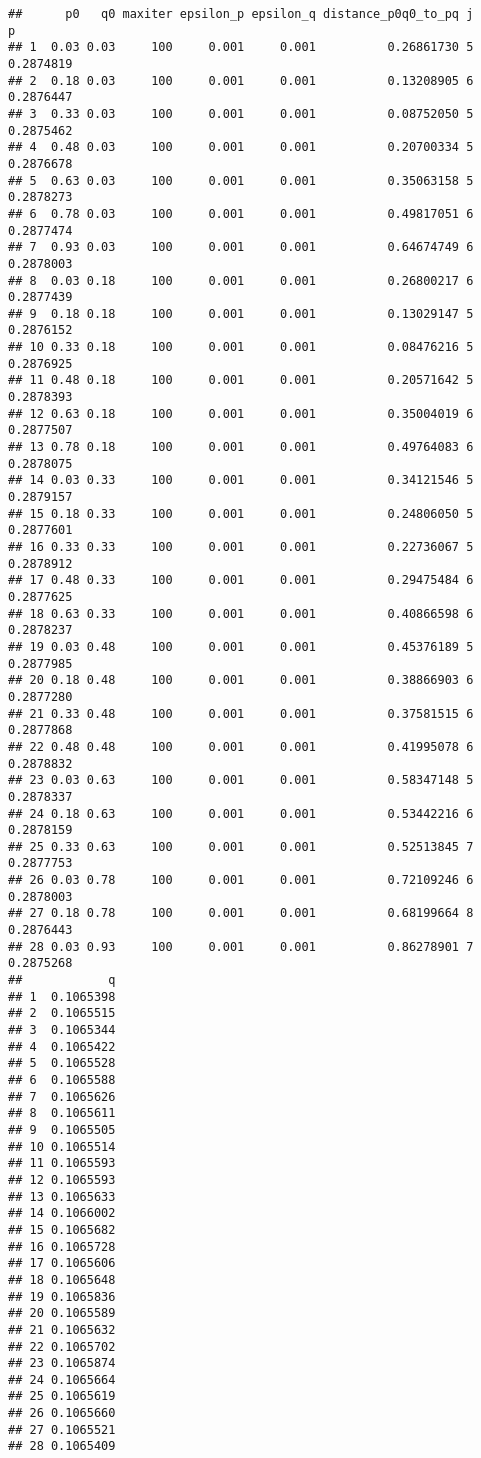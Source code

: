 \documentclass[]{article}
\begin{document}
\begin{verbatim}
##      p0   q0 maxiter epsilon_p epsilon_q distance_p0q0_to_pq j         p
## 1  0.03 0.03     100     0.001     0.001          0.26861730 5 0.2874819
## 2  0.18 0.03     100     0.001     0.001          0.13208905 6 0.2876447
## 3  0.33 0.03     100     0.001     0.001          0.08752050 5 0.2875462
## 4  0.48 0.03     100     0.001     0.001          0.20700334 5 0.2876678
## 5  0.63 0.03     100     0.001     0.001          0.35063158 5 0.2878273
## 6  0.78 0.03     100     0.001     0.001          0.49817051 6 0.2877474
## 7  0.93 0.03     100     0.001     0.001          0.64674749 6 0.2878003
## 8  0.03 0.18     100     0.001     0.001          0.26800217 6 0.2877439
## 9  0.18 0.18     100     0.001     0.001          0.13029147 5 0.2876152
## 10 0.33 0.18     100     0.001     0.001          0.08476216 5 0.2876925
## 11 0.48 0.18     100     0.001     0.001          0.20571642 5 0.2878393
## 12 0.63 0.18     100     0.001     0.001          0.35004019 6 0.2877507
## 13 0.78 0.18     100     0.001     0.001          0.49764083 6 0.2878075
## 14 0.03 0.33     100     0.001     0.001          0.34121546 5 0.2879157
## 15 0.18 0.33     100     0.001     0.001          0.24806050 5 0.2877601
## 16 0.33 0.33     100     0.001     0.001          0.22736067 5 0.2878912
## 17 0.48 0.33     100     0.001     0.001          0.29475484 6 0.2877625
## 18 0.63 0.33     100     0.001     0.001          0.40866598 6 0.2878237
## 19 0.03 0.48     100     0.001     0.001          0.45376189 5 0.2877985
## 20 0.18 0.48     100     0.001     0.001          0.38866903 6 0.2877280
## 21 0.33 0.48     100     0.001     0.001          0.37581515 6 0.2877868
## 22 0.48 0.48     100     0.001     0.001          0.41995078 6 0.2878832
## 23 0.03 0.63     100     0.001     0.001          0.58347148 5 0.2878337
## 24 0.18 0.63     100     0.001     0.001          0.53442216 6 0.2878159
## 25 0.33 0.63     100     0.001     0.001          0.52513845 7 0.2877753
## 26 0.03 0.78     100     0.001     0.001          0.72109246 6 0.2878003
## 27 0.18 0.78     100     0.001     0.001          0.68199664 8 0.2876443
## 28 0.03 0.93     100     0.001     0.001          0.86278901 7 0.2875268
##            q
## 1  0.1065398
## 2  0.1065515
## 3  0.1065344
## 4  0.1065422
## 5  0.1065528
## 6  0.1065588
## 7  0.1065626
## 8  0.1065611
## 9  0.1065505
## 10 0.1065514
## 11 0.1065593
## 12 0.1065593
## 13 0.1065633
## 14 0.1066002
## 15 0.1065682
## 16 0.1065728
## 17 0.1065606
## 18 0.1065648
## 19 0.1065836
## 20 0.1065589
## 21 0.1065632
## 22 0.1065702
## 23 0.1065874
## 24 0.1065664
## 25 0.1065619
## 26 0.1065660
## 27 0.1065521
## 28 0.1065409
\end{verbatim}
\end{document}
